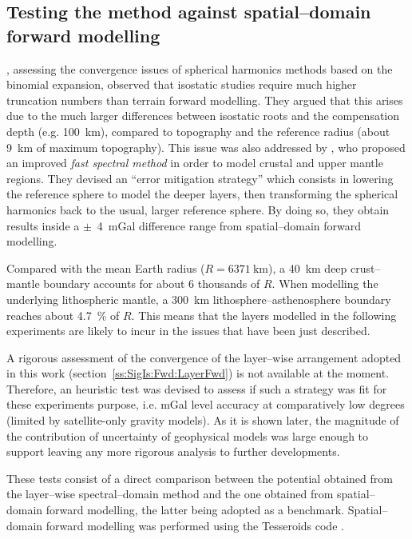 \subsection{Testing the method against spatial--domain forward modelling}
\label{ss:SigIs:Fwd:Test}
\Textcite{Sun2001}, assessing the convergence issues of spherical harmonics methods based on the binomial expansion, observed that isostatic studies require much higher truncation numbers than terrain forward modelling.
They argued that this arises due to the much larger differences between isostatic roots and the compensation depth (e.g. \SI{100}{\kilo \metre}), compared to topography and the reference radius (about \SI{9}{\kilo \metre} of maximum topography).
This issue was also addressed by \textcite{Root2015}, who proposed an improved \textit{fast spectral method} \parencites{Rummel1988}{Novak2006} in order to model crustal and upper mantle regions.
They devised an ``error mitigation strategy'' which consists in lowering the reference sphere to model the deeper layers, then transforming the spherical harmonics back to the usual, larger reference sphere.
By doing so, they obtain results inside a $\pm$~\SI{4}{\milli Gal} difference range from spatial--domain forward modelling.

Compared with the mean Earth radius ($R = \SI{6371}{\kilo \metre}$), a \SI{40}{\kilo \metre} deep crust--mantle boundary accounts for about 6 thousands of $R$.
When modelling the underlying lithospheric mantle, a \SI{300}{\kilo \metre} lithosphere--asthenosphere boundary reaches about \SI{4.7}{\percent} of $R$.
This means that the layers modelled in the following experiments are likely to incur in the issues that have been just described.

A rigorous assessment of the convergence of the layer--wise arrangement adopted in this work (section~\ref{ss:SigIs:Fwd:LayerFwd}) is not available at the moment.
Therefore, an heuristic test was devised to assess if such a strategy was fit for these experiments purpose, i.e. \si{\milli Gal} level accuracy at comparatively low degrees (limited by satellite-only gravity models).
As it is shown later, the magnitude of the contribution of uncertainty of geophysical models was large enough to support leaving any more rigorous analysis to further developments.

These tests consist of a direct comparison between the potential obtained from the layer--wise spectral--domain method and the one obtained from spatial--domain forward modelling, the latter being adopted as a benchmark.
Spatial--domain forward modelling was performed using the Tesseroids code \parencites{Uieda2016}{UiedaTesseroids}.

